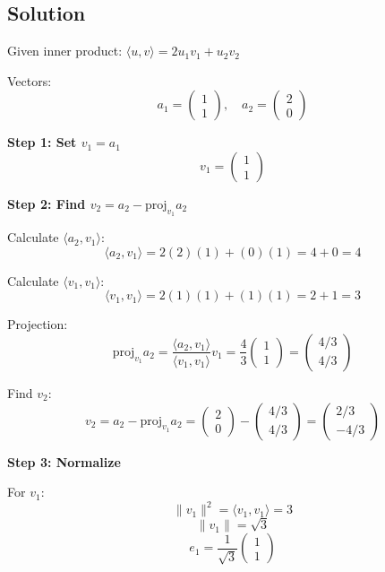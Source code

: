 \subsection*{Solution}

Given inner product: $\langle u, v \rangle = 2u_1v_1 + u_2v_2$

Vectors:
\[
a_1 = \begin{pmatrix} 1 \\ 1 \end{pmatrix}, \quad a_2 = \begin{pmatrix} 2 \\ 0 \end{pmatrix}
\]

\textbf{Step 1: Set $v_1 = a_1$}
\[
v_1 = \begin{pmatrix} 1 \\ 1 \end{pmatrix}
\]

\textbf{Step 2: Find $v_2 = a_2 - \text{proj}_{v_1} a_2$}

Calculate $\langle a_2, v_1 \rangle$:
\[
\langle a_2, v_1 \rangle = 2(2)(1) + (0)(1) = 4 + 0 = 4
\]

Calculate $\langle v_1, v_1 \rangle$:
\[
\langle v_1, v_1 \rangle = 2(1)(1) + (1)(1) = 2 + 1 = 3
\]

Projection:
\[
\text{proj}_{v_1} a_2 = \frac{\langle a_2, v_1 \rangle}{\langle v_1, v_1 \rangle} v_1 = \frac{4}{3} \begin{pmatrix} 1 \\ 1 \end{pmatrix} = \begin{pmatrix} 4/3 \\ 4/3 \end{pmatrix}
\]

Find $v_2$:
\[
v_2 = a_2 - \text{proj}_{v_1} a_2 = \begin{pmatrix} 2 \\ 0 \end{pmatrix} - \begin{pmatrix} 4/3 \\ 4/3 \end{pmatrix} = \begin{pmatrix} 2/3 \\ -4/3 \end{pmatrix}
\]

\textbf{Step 3: Normalize}

For $v_1$:
\[
\|v_1\|^2 = \langle v_1, v_1 \rangle = 3
\]
\[
\|v_1\| = \sqrt{3}
\]
\[
e_1 = \frac{1}{\sqrt{3}} \begin{pmatrix} 1 \\ 1 \end{pmatrix}
\]

